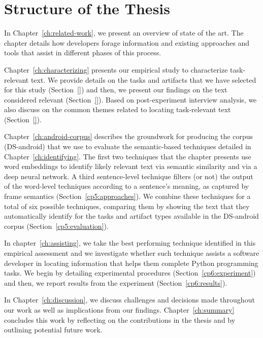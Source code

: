 \section{Structure of the Thesis}
\label{cp1:organization}

In Chapter~\ref{ch:related-work}, we present an overview of state of the art. The chapter details 
how developers forage information and existing approaches and tools 
that assist in different phases of this process.


Chapter~\ref{ch:characterizing} presents our empirical study to characterize task-relevant text.
We provide details on the tasks and artifacts that we have selected for this study (Section~\ref{})
and then, we present our findings on the text considered relevant (Section~\ref{}).
Based on post-experiment interview analysis, we also discuss  
on the common themes related to locating task-relevant text (Section~\ref{}).


Chapter~\ref{ch:android-corpus} describes the groundwork 
for producing the corpus (\acs{DS-android}) that we use to evaluate the semantic-based techniques 
detailed in Chapter~\ref{ch:identifying}.
The first two techniques that the chapter presents 
use word embeddings to identify likely relevant text via semantic similarity
and via a deep neural network.
A third sentence-level technique filters (or not) 
the output of the word-level techniques according to a sentence's meaning, as captured by frame semantics (Section~\ref{cp5:approaches}).
We combine these techniques for a total of six possible techniques, comparing them by showing
the text that they automatically identify for the tasks and artifact types
available in the \acs{DS-android} corpus  (Section~\ref{cp5:evaluation}).




In chapter~\ref{ch:assisting}, we take the best performing technique identified in this empirical assessment and 
we investigate 
whether such technique assists a software developer in locating information
that helps them complete Python programming tasks. We begin by detailing experimental procedures (Section~\ref{cp6:experiment})
and then, we report results from the experiment (Section~\ref{cp6:results}).


In Chapter~\ref{ch:discussion}, we discuss challenges and decisions 
made throughout our work 
as well as implications from our findings. 
Chapter~\ref{ch:summary} concludes this work by reflecting on the contributions in the thesis
and by outlining  potential future work. 
